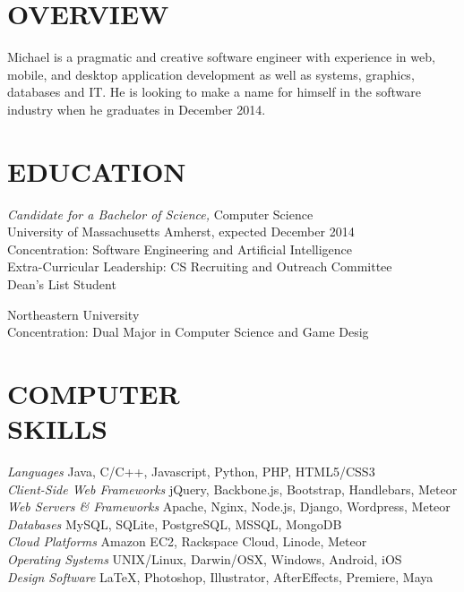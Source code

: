 \documentclass[line,margin]{res}
\begin{document}
\address{169 Brittany Mnr Apt F, Amherst, MA 01002}
\address{(781) 264-6283  --  mike@miketurley.com -- github.com/mturley}

\begin{resume}
 
\section{OVERVIEW}
    Michael is a pragmatic and creative software engineer with experience in web, mobile, and desktop application development as well as systems, graphics, databases and IT.  He is looking to make a name for himself in the software industry when he graduates in December 2014.
 
 
\section{EDUCATION}
    {\sl Candidate for a Bachelor of Science,} Computer Science \\
    University of Massachusetts Amherst, 
    expected December 2014 \\
    Concentration: Software Engineering and Artificial Intelligence \\
    Extra-Curricular Leadership: CS Recruiting and Outreach Committee \\
    Dean's List Student

    Northeastern University \\
    Concentration: Dual Major in Computer Science and Game Desig
 
 
\section{COMPUTER \\ SKILLS}
    {\sl Languages} \hfill Java, C/C++, Javascript, Python, PHP, HTML5/CSS3 \\
    {\sl Client-Side Web Frameworks} \hfill jQuery, Backbone.js, Bootstrap, Handlebars, Meteor \\
    {\sl Web Servers \& Frameworks} \hfill Apache, Nginx, Node.js, Django, Wordpress, Meteor \\
    {\sl Databases} \hfill MySQL, SQLite, PostgreSQL, MSSQL, MongoDB \\
    {\sl Cloud Platforms} \hfill Amazon EC2, Rackspace Cloud, Linode, Meteor \\
    {\sl Operating Systems} \hfill UNIX/Linux, Darwin/OSX, Windows, Android, iOS \\
    {\sl Design Software} \hfill \LaTeX, Photoshop, Illustrator, AfterEffects, Premiere, Maya
 

\end{resume}
\end{document}
